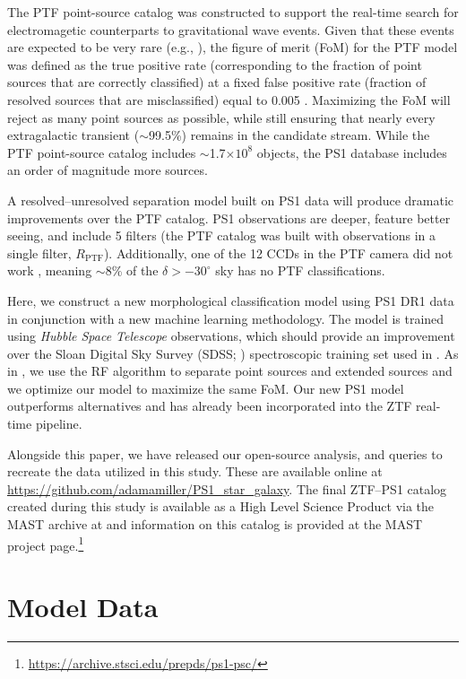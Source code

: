\documentclass[twocolumn, dvipdfmx]{aastex62}
\begin{document}
\begin{CJK*}{UTF8}{gbsn}
The PTF point-source catalog was constructed to support the real-time search
for electromagetic counterparts to gravitational wave events. Given that
these events are expected to be very rare (e.g., \citealt{Scolnic18}), the
figure of merit (FoM) for the PTF model was defined as the true positive
rate (corresponding to the fraction of point sources that are correctly
classified) at a fixed false positive rate (fraction of resolved sources that
are misclassified) equal to 0.005 \citep{Miller17}. Maximizing the FoM will
reject as many point sources as possible, while still ensuring that nearly
every extragalactic transient ($\sim$99.5\%) remains in the candidate
stream. While the PTF point-source catalog includes $\sim$1.7$\times 10^8$
objects, the PS1 database includes an order of magnitude more sources.

A resolved--unresolved separation model built on PS1 data will produce
dramatic improvements over the PTF catalog. PS1 observations are deeper,
feature better seeing, and include 5 filters (the PTF catalog was built with
observations in a single filter, $R_\mathrm{PTF}$). Additionally, one of the
12 CCDs in the PTF camera did not work \citep{Law09}, meaning $\sim$8\% of
the $\delta > -30^\circ$ sky has no PTF classifications.

Here, we construct a new morphological classification model using PS1 DR1
data in conjunction with a new machine learning methodology. The model is
trained using \textit{Hubble Space Telescope} observations, which should
provide an improvement over the Sloan Digital Sky Survey (SDSS;
\citealt{York00}) spectroscopic training set used in \citet{Miller17}. As in
\citet{Miller17}, we use the RF algorithm to separate point sources and
extended sources and we optimize our model to maximize the same FoM. Our new
PS1 model outperforms alternatives and has already been incorporated into
the ZTF real-time pipeline. 

Alongside this paper, we have released our open-source analysis, and queries
to recreate the data utilized in this study. These are available online at
\url{https://github.com/adamamiller/PS1_star_galaxy}. The final ZTF--PS1 catalog
created during this study is available as a High Level Science Product via
the MAST archive at  
and information on this catalog is provided at the MAST project page.\footnote{\url{https://archive.stsci.edu/prepds/ps1-psc/}}

\section{Model Data}\label{sec:model_data}


\end{CJK*}
\end{document}

